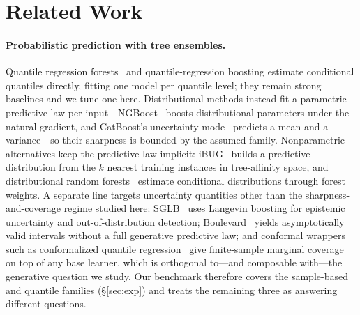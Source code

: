 \documentclass{article}
\begin{document}
\section{Related Work}\label{sec:related}

\paragraph{Probabilistic prediction with tree ensembles.} Quantile regression forests~\citep{meinshausen2006qrf} and quantile-regression boosting estimate conditional quantiles directly, fitting one model per quantile level; they remain strong baselines and we tune one here. Distributional methods instead fit a parametric predictive law per input---NGBoost~\citep{duan2020ngboost} boosts distributional parameters under the natural gradient, and CatBoost's uncertainty mode~\citep{prokhorenkova2018catboost} predicts a mean and a variance---so their sharpness is bounded by the assumed family. Nonparametric alternatives keep the predictive law implicit: iBUG~\citep{brophy2022ibug} builds a predictive distribution from the $k$ nearest training instances in tree-affinity space, and distributional random forests~\citep{cevid2022drf} estimate conditional distributions through forest weights. A separate line targets uncertainty quantities other than the sharpness-and-coverage regime studied here: SGLB~\citep{ustimenko2021sglb} uses Langevin boosting for epistemic uncertainty and out-of-distribution detection; Boulevard~\citep{zhou2022boulevard} yields asymptotically valid intervals without a full generative predictive law; and conformal wrappers such as conformalized quantile regression~\citep{romano2019cqr} give finite-sample marginal coverage on top of any base learner, which is orthogonal to---and composable with---the generative question we study. Our benchmark therefore covers the sample-based and quantile families (\S\ref{sec:exp}) and treats the remaining three as answering different questions.
\end{document}
